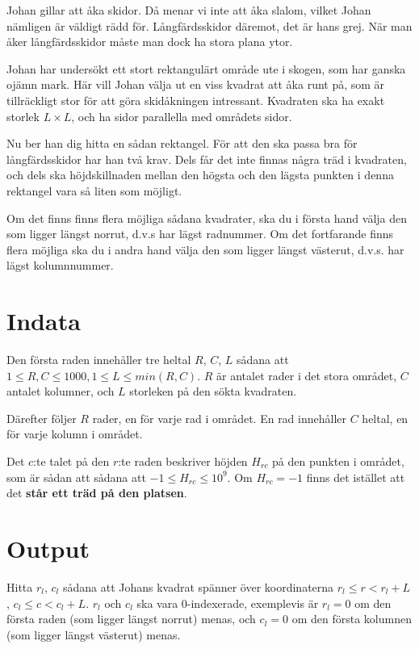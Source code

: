 Johan gillar att åka skidor.
Då menar vi inte att åka slalom, vilket Johan nämligen är väldigt rädd för.
Långfärdsskidor däremot, det är hans grej.
När man åker långfärdsskidor måste man dock ha stora plana ytor.

Johan har undersökt ett stort rektangulärt område ute i skogen, som har ganska ojämn mark.
Här vill Johan välja ut en viss kvadrat att åka runt på, som är tillräckligt stor för att göra skidåkningen intressant.
Kvadraten ska ha exakt storlek $L \times L$, och ha sidor parallella med områdets sidor.

Nu ber han dig hitta en sådan rektangel.
För att den ska passa bra för långfärdsskidor har han två krav.
Dels får det inte finnas några träd i kvadraten, och dels ska höjdskillnaden mellan den högsta och den lägsta punkten i denna rektangel vara så liten som möjligt.

Om det finns finns flera möjliga sådana kvadrater, ska du i första hand välja den som ligger längst norrut, d.v.s har lägst radnummer. Om det fortfarande finns flera möjliga
ska du i andra hand välja den som ligger längst västerut, d.v.s. har lägst kolumnnummer.

\section*{Indata}
Den första raden innehåller tre heltal $R$, $C$, $L$ sådana att $1\leq R,C \leq 1000, 1 \leq L \leq min(R,C)$.
$R$ är antalet rader i det stora området, $C$ antalet kolumner, och $L$ storleken på den sökta kvadraten.

Därefter följer $R$ rader, en för varje rad i området. En rad innehåller $C$ heltal, en för varje kolumn i området.

Det $c$:te talet på den $r$:te raden beskriver höjden $H_{rc}$ på den punkten i området, som är sådan att sådana att $-1 \leq H_{rc} \leq 10^9$.
Om $H_{rc} = -1$ finns det istället att det \textbf{står ett träd på den platsen}.

\section*{Output}
Hitta $r_l$, $c_l$ sådana att Johans kvadrat spänner över koordinaterna $r_l \leq r <r_l + L$, $c_l \leq c < c_l + L$. $r_l$ och $c_l$ ska vara 0-indexerade, exemplevis är $r_l = 0$ om den första raden (som ligger längst norrut) menas, och $c_l = 0$ om den första kolumnen (som ligger längst västerut) menas.

